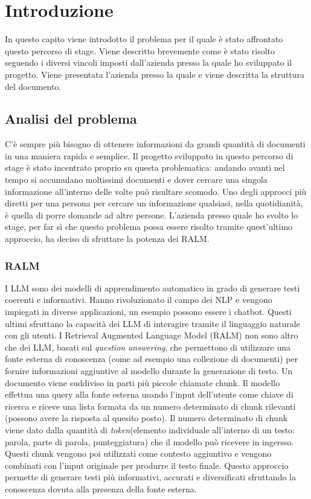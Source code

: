 \chapter{Introduzione}
\label{cap:introduzione}

In questo capito viene introdotto il problema per il quale è stato affrontato questo percorso di stage.
Viene descritto brevemente come è stato risolto seguendo i diversi vincoli imposti dall'azienda presso la quale ho sviluppato il progetto.
Viene presentata l'azienda presso la quale e viene descritta la struttura del documento.

\section{Analisi del problema}
C'è sempre più bisogno di ottenere informazioni da grandi quantità di documenti in una maniera rapida e semplice.
Il progetto sviluppato in questo percorso di stage è stato incentrato proprio su questa problematica: andando avanti nel tempo si accumulano moltissimi documenti e dover cercare una singola informazione all'interno delle volte può risultare scomodo.
Uno degli approcci più diretti per una persona per cercare un informazione qualsiasi, nella quotidianità, è quella di porre domande ad altre persone.
L'azienda presso quale ho svolto lo stage, per far sì che questo problema possa essere risolto tramite quest'ultimo approccio, ha deciso di sfruttare la potenza dei RALM. \\

\subsection{RALM}
I \gls{LLM} sono dei modelli di apprendimento automatico in grado di generare testi coerenti e informativi.
Hanno rivoluzionato il campo dei \gls{NLP} e vengono impiegati in diverse applicazioni, un esempio possono essere i chatbot.
Questi ultimi sfruttano la capacità dei LLM di interagire tramite il linguaggio naturale con gli utenti.
I Retrieval Augmented Language Model (RALM) non sono altro che dei LLM, basati sul \emph{\gls{question answering}}\glsfirstoccur, che permettono di utilizzare una fonte esterna di conoscenza (come ad esempio una collezione di documenti)
per fornire informazioni aggiuntive al modello durante la generazione di testo.
\noindent Un documento viene suddiviso in parti più piccole chiamate chunk. 
Il modello effettua una query alla fonte esterna usando l'input dell'utente come chiave di ricerca e riceve una lista formata da un numero determinato di chunk rilevanti (possono avere la risposta al quesito posto).
Il numero determinato di chunk viene dato dalla quantità di \emph{\gls{token}}\glsfirstoccur (elemento individuale all'interno di un testo: parola, parte di parola, punteggiatura) che il modello può ricevere in ingersso.
Questi chunk vengono poi utilizzati come contesto aggiuntivo e vengono combinati con l'input originale per produrre il testo finale.
Questo approccio permette di generare testi più informativi, accurati e diversificati sfruttando la conoscenza dovuta alla presenza della fonte esterna.


